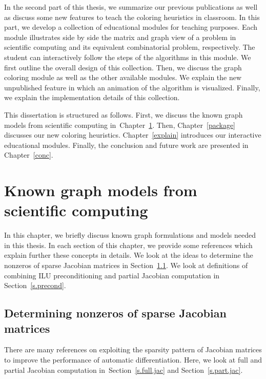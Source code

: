 \documentclass[12pt, twoside,a4paper,toc=bibliography]{scrbook}
\newcommand{\secref}[1]{Section~\protect\ref{#1}}
\newcommand{\chapref}[1]{Chapter~\protect\ref{#1}}
\begin{document}
In the second part of this thesis, we summarize our previous publications
\cite{2013:05,2014:01,2014:02,2014:09,2015:3,cscpaper} as well as discuss some new features to teach
the coloring heuristics in classroom. In this part, we develop a collection of educational modules for
teaching purposes. Each module illustrates side by side the matrix and graph view of a problem in
scientific computing and its equivalent combinatorial problem, respectively. The student can
interactively follow the steps of the algorithms in this module. We first outline the overall design of
this collection. Then, we discuss the graph coloring module as well as the other available modules.
We explain the new unpublished feature in which an animation of the algorithm is visualized.
Finally, we explain the implementation details of this collection.

This dissertation is structured as follows. First, we discuss the known graph models from scientific
computing in~\chapref{prel}. Then, \chapref{package} discusses our new coloring heuristics.
\chapref{explain} introduces our interactive educational modules. Finally, the conclusion and future
work are presented in \chapref{conc}.

\chapter{Known graph models from scientific computing}
\label{prel}
In this chapter, we briefly discuss known graph formulations and
models needed in this thesis. In each section of this chapter,
we provide some references which explain further these concepts in details.
We look at the ideas to determine the nonzeros of sparse Jacobian matrices in
\secref{s.det.nonzero}.
We look at definitions of combining ILU preconditioning and
partial Jacobian computation in \secref{s.precond}.

\section{Determining nonzeros of sparse Jacobian matrices}
\label{s.det.nonzero}
There are many references on exploiting the sparsity pattern of Jacobian matrices
to improve the performance of automatic differentiation.
Here, we look at full and partial Jacobian computation in~\secref{s.full.jac} and \secref{s.part.jac}.
\end{document}
